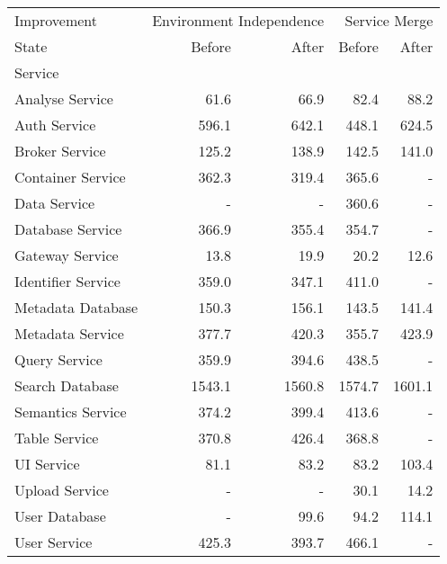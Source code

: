 \begin{tabular}{lrrrr}
\toprule
Improvement & \multicolumn{2}{r}{Environment Independence} & \multicolumn{2}{r}{Service Merge} \\
State & Before & After & Before & After \\
Service &  &  &  &  \\
\midrule
Analyse Service & 61.6 & 66.9 & 82.4 & 88.2 \\
Auth Service & 596.1 & 642.1 & 448.1 & 624.5 \\
Broker Service & 125.2 & 138.9 & 142.5 & 141.0 \\
Container Service & 362.3 & 319.4 & 365.6 & - \\
Data Service & - & - & 360.6 & - \\
Database Service & 366.9 & 355.4 & 354.7 & - \\
Gateway Service & 13.8 & 19.9 & 20.2 & 12.6 \\
Identifier Service & 359.0 & 347.1 & 411.0 & - \\
Metadata Database & 150.3 & 156.1 & 143.5 & 141.4 \\
Metadata Service & 377.7 & 420.3 & 355.7 & 423.9 \\
Query Service & 359.9 & 394.6 & 438.5 & - \\
Search Database & 1543.1 & 1560.8 & 1574.7 & 1601.1 \\
Semantics Service & 374.2 & 399.4 & 413.6 & - \\
Table Service & 370.8 & 426.4 & 368.8 & - \\
UI Service & 81.1 & 83.2 & 83.2 & 103.4 \\
Upload Service & - & - & 30.1 & 14.2 \\
User Database & - & 99.6 & 94.2 & 114.1 \\
User Service & 425.3 & 393.7 & 466.1 & - \\
\bottomrule
\end{tabular}
